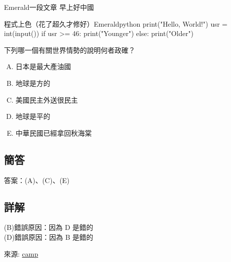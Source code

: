 \documentclass{article}
\begin{document}

\begin{large}
\begin{boxpar}{Emerald}{一段文章}
早上好中國
\begin{mintbox}{程式上色（花了超久才修好）}{Emerald}{python}
print("Hello, World!")
usr = int(input())
if usr >= 46:
    print("Younger")
else:
    print("Older")
\end{mintbox}
\end{boxpar}
\begin{tcolorbox}[title=多選題,colback=Emerald!5!white,colframe=Emerald!75!black]

下列哪一個有關世界情勢的說明何者政確？\\

\begin{enumerate}[(A)]
    \item 日本是最大產油國
    \item 地球是方的
    \item 美國民主外送很民主
    \item 地球是平的
    \item 中華民國已經拿回秋海棠
\end{enumerate}

\subsection*{簡答}
答案：(A)、(C)、(E)\\

\subsection*{詳解}

(B)錯誤原因：因為 D 是錯的\\
(D)錯誤原因：因為 B 是錯的\\
\end{tcolorbox}
\end{large}
來源: \href{https://github.com/hsnucrc46/camp}{camp}
\end{document}
